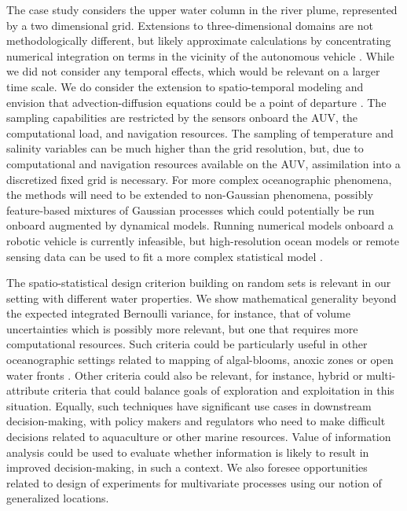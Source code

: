\documentclass[aoas]{imsart}
\begin{document}
The case study considers the upper water column in the river plume,
represented by a two dimensional grid. Extensions to three-dimensional
domains are not methodologically different, but likely approximate
calculations by concentrating numerical integration on terms in the
vicinity of the autonomous vehicle \citep{fossum18b}. While we did not
consider any temporal effects, which would be relevant on a larger
time scale. We do consider the extension to spatio-temporal modeling
and envision that advection-diffusion equations could be a point of departure
\citep{sigrist2015stochastic,richardson2017sparsity}. The sampling
capabilities are restricted by the sensors onboard the AUV, the
computational load, and navigation resources. The sampling of
temperature and salinity variables can be much higher than the grid
resolution, but, due to computational and navigation resources
available on the AUV, assimilation into a discretized fixed grid is
necessary. For more complex oceanographic phenomena, the methods will
need to be extended to non-Gaussian phenomena, possibly feature-based
mixtures of Gaussian processes which could potentially be run onboard
augmented by dynamical models. Running numerical models onboard a
robotic vehicle is currently infeasible, but high-resolution ocean
models or remote sensing data can be used to fit a more complex
statistical model \citep{davidson19}.

The spatio-statistical design criterion building on random sets is
relevant in our setting with different water properties.  We show
mathematical generality beyond the expected integrated Bernoulli
variance, for instance, that of volume uncertainties which is possibly
more relevant, but one that requires more computational resources.
Such criteria could be particularly useful in other oceanographic
settings related to mapping of algal-blooms, anoxic zones or open
water fronts \citep{costa19}.  Other criteria could also be relevant,
for instance, hybrid or multi-attribute criteria that could balance
goals of exploration and exploitation in this situation. Equally, such
techniques have significant use cases in downstream decision-making,
with policy makers and regulators who need to make difficult decisions
related to aquaculture or other marine resources. Value of information
analysis \citep{Eidsvik:15} could be used to evaluate whether
information is likely to result in improved decision-making, in such a
context.  We also foresee opportunities related to design of
experiments for multivariate processes using our notion of generalized
locations.
\end{document}
